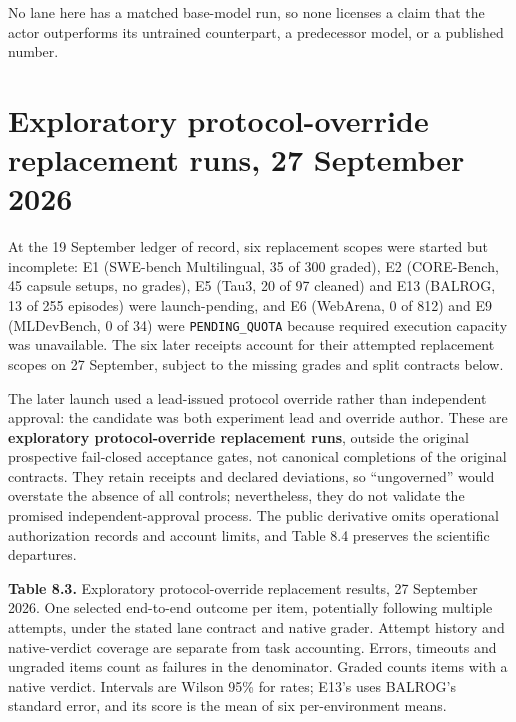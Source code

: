 \documentclass[12pt,a4paper]{report}
\begin{document}
No lane here has a matched base-model run, so none licenses a claim that
the actor outperforms its untrained counterpart, a predecessor model, or
a published number.

\section{Exploratory protocol-override replacement runs, 27 September
2026}\label{exploratory-protocol-override-replacement-runs-27-september-2026}

At the 19 September ledger of record, six replacement scopes were
started but incomplete: E1 (SWE-bench Multilingual, 35 of 300 graded),
E2 (CORE-Bench, 45 capsule setups, no grades), E5 (Tau3, 20 of 97
cleaned) and E13 (BALROG, 13 of 255 episodes) were launch-pending, and
E6 (WebArena, 0 of 812) and E9 (MLDevBench, 0 of 34) were
\texttt{PENDING\_QUOTA} because required execution capacity was
unavailable. The six later receipts account for their attempted
replacement scopes on 27 September, subject to the missing grades and
split contracts below.

The later launch used a lead-issued protocol override rather than
independent approval: the candidate was both experiment lead and
override author. These are \textbf{exploratory protocol-override
replacement runs}, outside the original prospective fail-closed
acceptance gates, not canonical completions of the original contracts.
They retain receipts and declared deviations, so ``ungoverned'' would
overstate the absence of all controls; nevertheless, they do not
validate the promised independent-approval process. The public
derivative omits operational authorization records and account limits,
and Table 8.4 preserves the scientific departures.

\textbf{Table
8.3.} Exploratory protocol-override replacement results, 27 September
2026. One selected end-to-end outcome per item, potentially following
multiple attempts, under the stated lane contract and native grader.
Attempt history and native-verdict coverage are separate from task
accounting. Errors, timeouts and ungraded items count as failures in the
denominator. Graded counts items with a native verdict. Intervals are
Wilson 95\% for rates; E13's uses BALROG's standard error, and its score
is the mean of six per-environment means.
\end{document}
